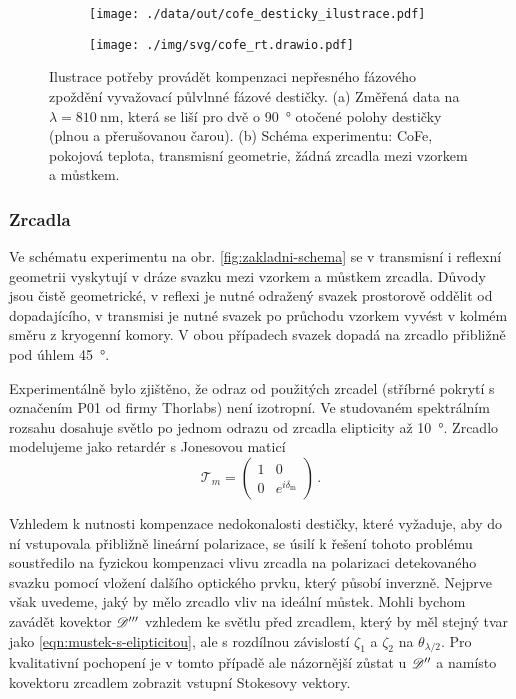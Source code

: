 \begin{figure}[htbp]
    \centering
    \begin{subfigure}{.48\textwidth}
        \centering
        \texttt{[image: ./data/out/cofe\_desticky\_ilustrace.pdf]}
    \end{subfigure}
    \begin{subfigure}{.48\textwidth}
        \centering
        \texttt{[image: ./img/svg/cofe\_rt.drawio.pdf]}
    \end{subfigure}
    \caption{Ilustrace potřeby provádět kompenzaci nepřesného fázového zpoždění vyvažovací půlvlnné fázové destičky. (a) Změřená data na $\lambda=\SI{810}{\nano\meter}$, která se liší pro dvě o \SI{90}{\degree} otočené polohy destičky (plnou a přerušovanou čarou). (b) Schéma experimentu: CoFe, pokojová teplota, transmisní geometrie, žádná zrcadla mezi vzorkem a můstkem.}
    \label{fig:mustek-desticka-ilustrace}
\end{figure}

\subsubsection*{Zrcadla}

Ve schématu experimentu na obr. \ref{fig:zakladni-schema} se v transmisní i reflexní geometrii vyskytují v dráze svazku mezi vzorkem a můstkem zrcadla.
Důvody jsou čistě geometrické, v reflexi je nutné odražený svazek prostorově oddělit od dopadajícího, v transmisi je nutné svazek po průchodu vzorkem vyvést v kolmém směru z kryogenní komory.
V obou případech svazek dopadá na zrcadlo přibližně pod úhlem \SI{45}{\degree}.

Experimentálně bylo zjištěno, že odraz od použitých zrcadel (stříbrné pokrytí s označením P01 od firmy Thorlabs) není izotropní.
Ve studovaném spektrálním rozsahu dosahuje světlo po jednom odrazu od zrcadla elipticity až \SI{10}{\degree}.
Zrcadlo modelujeme jako retardér s Jonesovou maticí
\begin{equation}
    \mathcal{T}_m = \begin{pmatrix} 1&0\\0&e^{i\delta_\textrm{m}} \end{pmatrix} \,.
\end{equation}

Vzhledem k nutnosti kompenzace nedokonalosti destičky, které vyžaduje, aby do ní vstupovala přibližně lineární polarizace, se úsilí k řešení tohoto problému soustředilo na fyzickou kompenzaci vlivu zrcadla na polarizaci detekovaného svazku pomocí vložení dalšího optického prvku, který působí inverzně.
Nejprve však uvedeme, jaký by mělo zrcadlo vliv na ideální můstek.
Mohli bychom zavádět kovektor $\mathscr{D}'''$ vzhledem ke světlu před zrcadlem, který by měl stejný tvar jako \eqref{eqn:mustek-s-elipticitou}, ale s rozdílnou závislostí $\zeta_1$ a $\zeta_2$ na $\theta_{\lambda/2}$.
Pro kvalitativní pochopení je v tomto případě ale názornější zůstat u $\mathscr{D}''$ a namísto kovektoru zrcadlem zobrazit vstupní Stokesovy vektory.

